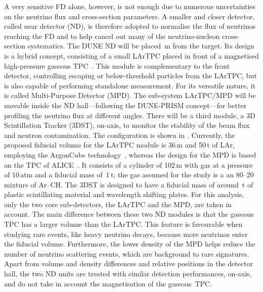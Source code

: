 A very sensitive FD alone, however, is not enough due to numerous uncertainties on the neutrino flux and cross-section parameters.
A smaller and closer detector, called near detector (ND), is therefore adopted to normalise %
the flux of neutrinos reaching the FD and to help cancel out many of the neutrino-nucleon cross-section systematics.
The DUNE ND will be placed \,m from the target.
Its design is a hybrid concept, consisting of a small LArTPC placed in front of a magnetised high-pressure gaseous TPC~\cite{Abi:2020wmh}.
This module is complementary to the front detector, controlling escaping or below-threshold particles from the LArTPC, %
but is also capable of performing standalone measurement.
For its versatile nature, it is called Multi-Purpose Detector (MPD).
The sub-system LArTPC/MPD will be movable inside the ND hall---following the DUNE-PRISM concept---for %
better profiling the neutrino flux at different angles.
There will be a third module, a 3D Scintillation Tracker (3DST), on-axis, to monitor %
the stability of the beam flux and neutron contamination.
The configuration is shown in .
Currently, the proposed fiducial volume for the LArTPC module is 36\,m and 50\,t of LAr, %
employing the ArgonCube technology~\cite{Asaadi:2018xfh}, %
whereas the design for the MPD is based on the TPC of \mbox{ALICE}~\cite{Glassel:2004jv}.
It consists of a cylinder of 102\,m with gas at a pressure of 10\,atm and a fiducial mass of~1\,t; %
the gas assumed for the study is a an 80--20 mixture of Ar--CH.
The 3DST is designed to have a fiducial mass of around \,t of plastic scintillating material and %
wavelength shifting plates.
For this analysis, only the two core sub-detectors, the LArTPC and the MPD, are taken in account.
The main difference between these two ND modules is that the gaseous TPC has a larger volume than the LArTPC.
This feature is favourable when studying rare events, like heavy neutrino decays, because more neutrinos enter the fiducial volume.
Furthermore, the lower density of the MPD helps reduce the number of neutrino scattering events, which are background to rare signatures.
Apart from volume and density differences and relative positions in the detector hall, %
the two ND units are treated with similar detection performances, on-axis, and do not take in account the magnetisation of the gaseous~TPC. 

